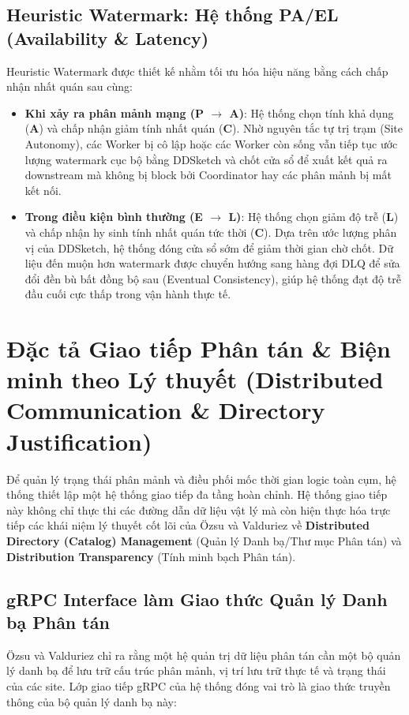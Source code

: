 \documentclass[12pt,a4paper]{article}
\begin{document}
\subsection{Heuristic Watermark: Hệ thống PA/EL (Availability \& Latency)}
Heuristic Watermark được thiết kế nhằm tối ưu hóa hiệu năng bằng cách chấp nhận nhất quán sau cùng:
\begin{itemize}
    \item \textbf{Khi xảy ra phân mảnh mạng (P $\rightarrow$ A)}: Hệ thống chọn tính khả dụng (\textbf{A}) và chấp nhận giảm tính nhất quán (\textbf{C}). Nhờ nguyên tắc tự trị trạm (Site Autonomy), các Worker bị cô lập hoặc các Worker còn sống vẫn tiếp tục ước lượng watermark cục bộ bằng DDSketch và chốt cửa sổ để xuất kết quả ra downstream mà không bị block bởi Coordinator hay các phân mảnh bị mất kết nối.
    \item \textbf{Trong điều kiện bình thường (E $\rightarrow$ L)}: Hệ thống chọn giảm độ trễ (\textbf{L}) và chấp nhận hy sinh tính nhất quán tức thời (\textbf{C}). Dựa trên ước lượng phân vị của DDSketch, hệ thống đóng cửa sổ sớm để giảm thời gian chờ chốt. Dữ liệu đến muộn hơn watermark được chuyển hướng sang hàng đợi DLQ để sửa đổi đền bù bất đồng bộ sau (Eventual Consistency), giúp hệ thống đạt độ trễ đầu cuối cực thấp trong vận hành thực tế.
\end{itemize}

\section{Đặc tả Giao tiếp Phân tán \& Biện minh theo Lý thuyết (Distributed Communication \& Directory Justification)}

Để quản lý trạng thái phân mảnh và điều phối mốc thời gian logic toàn cụm, hệ thống thiết lập một hệ thống giao tiếp đa tầng hoàn chỉnh. Hệ thống giao tiếp này không chỉ thực thi các đường dẫn dữ liệu vật lý mà còn hiện thực hóa trực tiếp các khái niệm lý thuyết cốt lõi của Özsu và Valduriez về \textbf{Distributed Directory (Catalog) Management} (Quản lý Danh bạ/Thư mục Phân tán) và \textbf{Distribution Transparency} (Tính minh bạch Phân tán).

\subsection{gRPC Interface làm Giao thức Quản lý Danh bạ Phân tán}
Özsu và Valduriez chỉ ra rằng một hệ quản trị dữ liệu phân tán cần một bộ quản lý danh bạ để lưu trữ cấu trúc phân mảnh, vị trí lưu trữ thực tế và trạng thái của các site. Lớp giao tiếp gRPC của hệ thống đóng vai trò là giao thức truyền thông của bộ quản lý danh bạ này:
\end{document}
